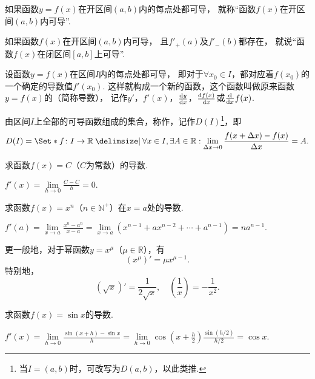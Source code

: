 \begin{definition}
如果函数\(y = f(x)\)在开区间\((a,b)\)内的每点处都可导，%
就称“函数\(f(x)\)在开区间\((a,b)\)内可导”.

如果函数\(f(x)\)在开区间\((a,b)\)内可导，%
且\(f'_{+}(a)\)及\(f'_{-}(b)\)都存在，%
就说“函数\(f(x)\)在闭区间\([a,b]\)上可导”.
\end{definition}

\begin{definition}
设函数\(y = f(x)\)在区间\(I\)内的每点处都可导，%
即对于\(\forall x_0 \in I\)，都对应着\(f(x_0)\)的一个确定的导数值\(f'(x_0)\).
这样就构成一个新的函数，这个函数叫做原来函数\(y = f(x)\)的（简称导数），%
记作\(y'\)，\(f'(x)\)，\(\dv{y}{x}\)，\(\dv{f(x)}{x}\)或\(\dv{x} f(x)\).
\end{definition}

\begin{definition}\label{definition:函数族.可导函数族}
由区间\(I\)上全部的可导函数组成的集合，称作，记作\(D(I)\)\footnote{%
当\(I=(a,b)\)时，可改写为\(D(a,b)\)，以此类推.%
}，即\[
D(I) = \Set*{
	f\colon I \to \mathbb{R}
	\given
	\forall x \in I, \exists A \in \mathbb{R} :
		\lim\limits_{\increment x\to0} \frac{f(x+\increment x)-f(x)}{\increment x} = A
}.
\]
\end{definition}

\begin{example}
求函数\(f(x) = C\)（\(C\)为常数）的导数.
\begin{solution}
\(f'(x)
= \lim\limits_{h\to0}\frac{C-C}{h}
= 0.\)
\end{solution}
\end{example}

\begin{example}
求函数\(f(x) = x^n\)（\(n\in\mathbb{N}^+\)）在\(x=a\)处的导数.
\begin{solution}
\(f'(a)
= \lim\limits_{x \to a}\frac{x^n-a^n}{x-a}
= \lim\limits_{x \to a}(x^{n-1}+ax^{n-2}+\dotsb+a^{n-1})
= na^{n-1}.\)
\end{solution}

更一般地，对于幂函数\(y=x^{\mu}\)（\(\mu\in\mathbb{R}\)），有\[
(x^{\mu})' = \mu x^{\mu-1}.
\]特别地，\[
(\sqrt x)' = \frac{1}{2 \sqrt x},
\quad
\left(\frac{1}{x}\right) = -\frac{1}{x^2}.
\]
\end{example}

\begin{example}
求函数\(f(x) = \sin x\)的导数.
\begin{solution}
\(f'(x) = \lim\limits_{h\to0}\frac{\sin(x+h)-\sin x}{h}
= \lim\limits_{h\to0}{\cos(x+\frac{h}{2}) \frac{\sin(h/2)}{h/2}}
= \cos x.\)
\end{solution}
\end{example}

